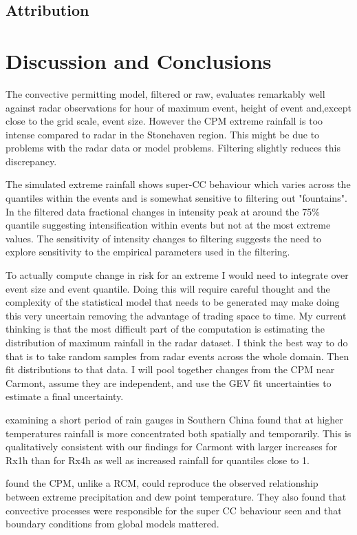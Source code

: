 \documentclass[11pt,a4paper]{article}
\begin{document}
\subsection{Attribution}

\section{Discussion and Conclusions}
The convective permitting model, filtered or raw, evaluates remarkably well against radar observations for hour of maximum event, height of event and,except close to the grid scale, event size. However the CPM extreme rainfall is too intense compared to radar in the Stonehaven region. This might be due to problems with the radar data or model problems.  Filtering slightly reduces this discrepancy. 

The simulated extreme rainfall shows super-CC behaviour  which varies across the quantiles within the events and is somewhat sensitive to filtering out "fountains". In the filtered data fractional changes in intensity peak at around the 75\% quantile suggesting intensification within events but not at the most extreme values. The sensitivity of intensity changes to filtering suggests the need to explore sensitivity to the empirical parameters used in the filtering.
 
 
 To actually  compute change in risk for an extreme I would need to integrate over event size and event quantile. Doing this will require careful thought and the complexity of the statistical model  that needs to be generated may make doing this very uncertain removing the advantage of trading space to time.  My current thinking is that the most difficult part of the computation is estimating the distribution of maximum rainfall in the radar dataset. I think the best way to do that is to take random samples from radar events across the whole domain. Then fit distributions to that data.  I will pool together changes from the CPM near Carmont, assume they are independent, and use the GEV fit  uncertainties to estimate a final uncertainty. 

   \cite{long2021rainfall_conc} examining a short period of rain gauges in Southern China found that at higher temperatures rainfall is more concentrated both spatially and temporarily. This is qualitatively consistent with our findings for Carmont with larger increases for Rx1h than for Rx4h as well as increased rainfall for quantiles close to 1.

\cite{Lee2022CPM_Korea} found the CPM, unlike a RCM, could reproduce the observed relationship between extreme precipitation and dew point temperature. They also found that convective processes were responsible for the super CC behaviour seen and that boundary conditions from global models mattered. 
\end{document}
